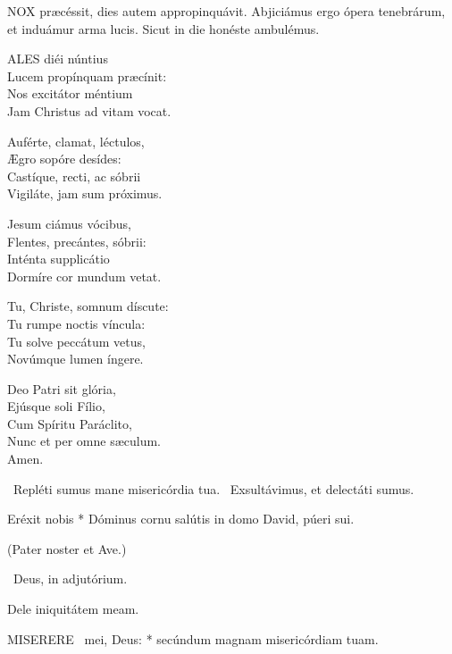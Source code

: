 

\lettrine[lines=2]{N}{OX} præcéssit, dies autem appropinquávit. Abjiciámus ergo ópera tenebrárum, et induámur arma lucis. Sicut in die honéste ambulémus.


\lettrine[lines=2]{A}{LES} diéi núntius\\
Lucem propínquam præcínit:\\
Nos excitátor méntium\\
Jam Christus ad vitam vocat.

Auférte, clamat, léctulos,\\
Ægro sopóre desídes:\\
Castíque, recti, ac sóbrii\\
Vigiláte, jam sum próximus.

Jesum ciámus vócibus,\\
Flentes, precántes, sóbrii:\\
Inténta supplicátio\\
Dormíre cor mundum vetat.

Tu, Christe, somnum díscute:\\
Tu rumpe noctis víncula:\\
Tu solve peccátum vetus,\\
Novúmque lumen íngere.

Deo Patri sit glória,\\
Ejúsque soli Fílio,\\
Cum Spíritu Paráclito,\\
Nunc et per omne sæculum.\\
Amen.

\V\ Repléti sumus mane misericórdia tua. \R\ Exsultávimus, et delectáti sumus.

 Eréxit nobis * Dóminus cornu salútis in domo David, púeri sui.




(Pater noster et Ave.)

\V\ Deus, in adjutórium.

 Dele iniquitátem meam.


\lettrine[lines=2]{M}{ISERERE} \textdagger\ mei, Deus: * secúndum magnam misericórdiam tuam.

